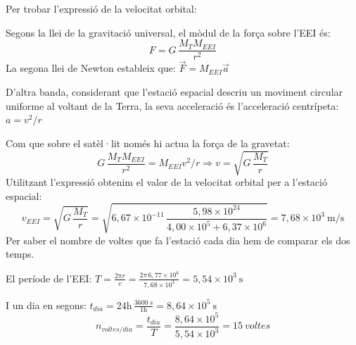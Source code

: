 \begin{solapartat}
Per trobar l'expressió de la velocitat orbital:

 Segons la llei de la gravitació universal, el mòdul de la força sobre l'EEI és:
\[ F = G\,\frac{M_TM_{EEI}}{r^2} \]
 La segona llei de Newton estableix que: $\vec{F} = M_{EEI}\vec{a}$

 D'altra banda, considerant que l'estació espacial descriu un moviment circular uniforme al voltant de la Terra, la seva acceleració és l'acceleració centrípeta: $a = v^2/r$

 Com que sobre el satèl·lit només hi actua la força de la gravetat:
\[ G\,\frac{M_TM_{EEI}}{r^2} = M_{EEI}v^2/r \Rightarrow v = \sqrt{G\,\frac{M_T}{r}} \]
 Utilitzant l'expressió obtenim el valor de la velocitat orbital per a l'estació espacial:
\[ v_{EEI} = \sqrt{G\,\frac{M_T}{r}} = \sqrt{6,67\times 10^{-11}\,\frac{5,98\times 10^{24}}{4,00\times 10^{5} + 6,37\times 10^{6}}} = 7,68\times 10^{3}\ \mathrm{m/s} \]
 Per saber el nombre de voltes que fa l'estació cada dia hem de comparar els dos temps.

El període de l'EEI: $T = \frac{2\pi r}{v} = \frac{2\pi\, 6,77\times 10^{6}}{7,68\times 10^{3}} = 5,54\times 10^{3}\ \mathrm{s}$

 I un dia en segons: $t_{dia} = 24\mathrm{h}\,\frac{3600\ s}{1\mathrm{h}} = 8,64\times 10^{5}\ \mathrm{s}$
\[ n_{voltes/dia} = \frac{t_{dia}}{T} = \frac{8,64\times 10^{5}}{5,54\times 10^{3}} = 15\ voltes \]
\end{solapartat}

